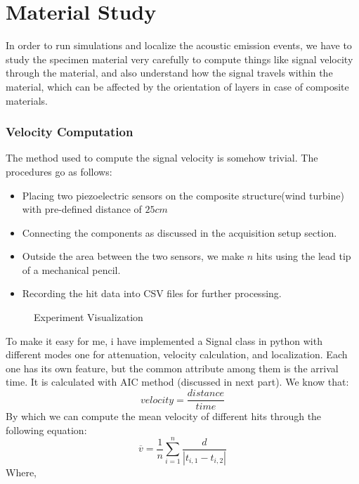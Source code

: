 

\large

\part{Material Study}

In order to run simulations and localize the acoustic emission events,
we have to study the specimen material very carefully to compute things
like signal velocity through the material, and also understand how the
signal travels within the material, which can be affected by the
orientation of layers in case of composite materials.

\section{Velocity Computation}

The method used to compute the signal velocity is somehow trivial. The
procedures go as follows:

\begin{itemize}
\item
  Placing two piezoelectric sensors on the composite structure(wind
  turbine) with pre-defined distance of {\(25cm\)}
\item
  Connecting the components as discussed in the acquisition setup
  section.
\item
  Outside the area between the two sensors, we make {\(n\)} hits using
  the lead tip of a mechanical pencil.
\item
  Recording the hit data into CSV files for further processing.
\end{itemize}
    \begin{figure}[htbp]
        \centering
        \scalebox{1.2}{}
        \caption{Experiment Visualization }
        \label{fig:label}
    \end{figure}

To make it easy for me, i have implemented a Signal class in python with
different modes one for attenuation, velocity calculation, and
localization. Each one has its own feature, but the common attribute
among them is the arrival time. It is calculated with AIC method
(discussed in next part). We know that:\\
{\[velocity = \frac{distance}{time}\]}By which we can compute the mean
velocity of different hits through the following equation:\\
{\[\overline{v} = \frac{1}{n}\sum\limits_{i = 1}^{n}\frac{d}{|t_{i,1} - t_{i,2}|}\]}Where,

